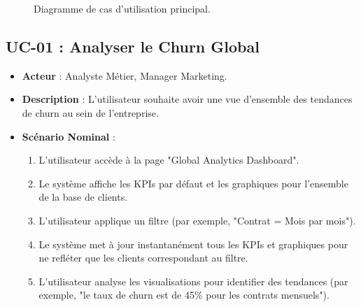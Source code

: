 \begin{figure}[H]
    \centering
    \caption{Diagramme de cas d'utilisation principal.}
    \label{fig:use_case_diagram}
\end{figure}

\subsection{UC-01 : Analyser le Churn Global}
\begin{itemize}
    \item \textbf{Acteur} : Analyste Métier, Manager Marketing.
    \item \textbf{Description} : L'utilisateur souhaite avoir une vue d'ensemble des tendances de churn au sein de l'entreprise.
    \item \textbf{Scénario Nominal} :
    \begin{enumerate}
        \item L'utilisateur accède à la page "Global Analytics Dashboard".
        \item Le système affiche les KPIs par défaut et les graphiques pour l'ensemble de la base de clients.
        \item L'utilisateur applique un filtre (par exemple, "Contrat = Mois par mois").
        \item Le système met à jour instantanément tous les KPIs et graphiques pour ne refléter que les clients correspondant au filtre.
        \item L'utilisateur analyse les visualisations pour identifier des tendances (par exemple, "le taux de churn est de 45\% pour les contrats mensuels").
    \end{enumerate}
\end{itemize}

